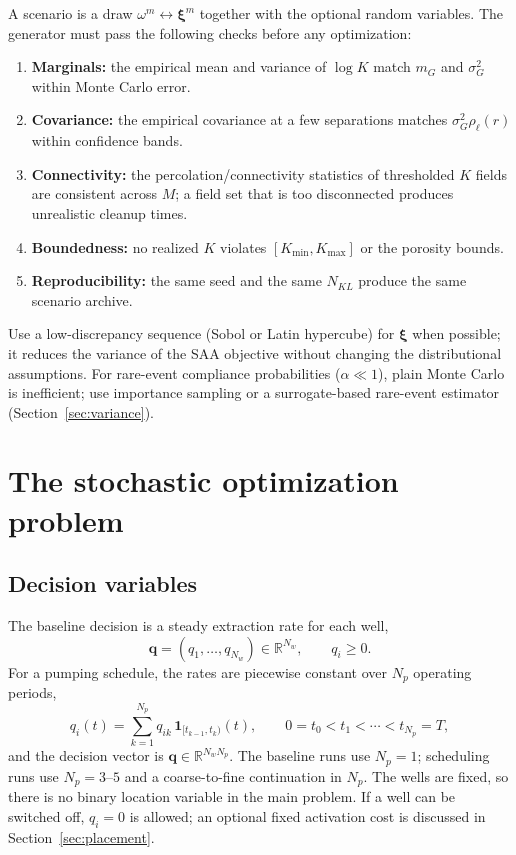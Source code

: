 \documentclass[11pt]{article}
\numberwithin{equation}{section}
\newcommand{\R}{\mathbb{R}}
\newcommand{\ind}{\mathbf{1}}
\theoremstyle{plain}
\begin{document}
A scenario is a draw $\omega^m\leftrightarrow\bm{\xi}^m$ together with the
optional random variables.  The generator must pass the following checks
before any optimization:
\begin{enumerate}[leftmargin=1.6em,itemsep=2pt]
  \item \textbf{Marginals:} the empirical mean and variance of $\log K$ match
        $m_G$ and $\sigma_G^2$ within Monte Carlo error.
  \item \textbf{Covariance:} the empirical covariance at a few separations
        matches $\sigma_G^2\rho_\ell(r)$ within confidence bands.
  \item \textbf{Connectivity:} the percolation/connectivity statistics of
        thresholded $K$ fields are consistent across $M$; a field set that is
        too disconnected produces unrealistic cleanup times.
  \item \textbf{Boundedness:} no realized $K$ violates
        $[K_{\min},K_{\max}]$ or the porosity bounds.
  \item \textbf{Reproducibility:} the same seed and the same $N_{KL}$ produce
        the same scenario archive.
\end{enumerate}
Use a low-discrepancy sequence (Sobol or Latin hypercube) for
$\bm{\xi}$ when possible; it reduces the variance of the SAA objective without
changing the distributional assumptions.  For rare-event compliance
probabilities ($\alpha\ll1$), plain Monte Carlo is inefficient; use importance
sampling or a surrogate-based rare-event estimator (Section~\ref{sec:variance}).

\section{The stochastic optimization problem}
\label{sec:program}

\subsection{Decision variables}

The baseline decision is a steady extraction rate for each well,
\begin{equation}
\label{eq:qsteady}
\mathbf{q}=(q_1,\dots,q_{N_w})\in\R^{N_w},
\qquad q_i\ge0.
\end{equation}
For a pumping schedule, the rates are piecewise constant over $N_p$ operating
periods,
\begin{equation}
\label{eq:qpiecewise}
q_i(t)=\sum_{k=1}^{N_p}q_{ik}\,\ind_{[t_{k-1},t_k)}(t),
\qquad
0=t_0<t_1<\cdots<t_{N_p}=T,
\end{equation}
and the decision vector is $\mathbf{q}\in\R^{N_wN_p}$.  The baseline runs use
$N_p=1$; scheduling runs use $N_p=3$--$5$ and a coarse-to-fine continuation in
$N_p$.  The wells are fixed, so there is no binary location variable in the
main problem.  If a well can be switched off, $q_i=0$ is allowed; an optional
fixed activation cost is discussed in Section~\ref{sec:placement}.
\end{document}
